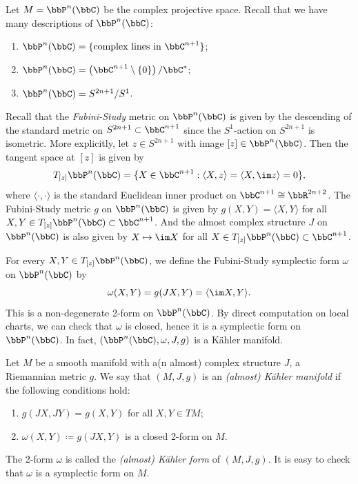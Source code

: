     \begin{example}
        Let \(M = \bbP^n(\bbC)\) be the complex projective space. 
        Recall that we have many descriptions of \(\bbP^n(\bbC)\):
        \begin{enumerate}
            \item \(\bbP^n(\bbC) = \{ \text{complex lines in } \bbC^{n+1} \}\);
            \item \(\bbP^n(\bbC) = \left(\bbC^{n+1} \setminus \{0\}\right) / \bbC^*\);
            \item \(\bbP^n(\bbC) = S^{2n+1} / S^1\).
        \end{enumerate}
        Recall that the \emph{Fubini-Study} metric on \(\bbP^n(\bbC)\) is given by the descending of the standard metric on \(S^{2n+1} \subset \bbC^{n+1}\) since the \(S^1\)-action on \(S^{2n+1}\) is isometric.
        More explicitly, let \(z \in S^{2n+1}\) with image \([z] \in \bbP^n(\bbC)\).
        Then the tangent space at \([z]\) is given by
        \[ T_{[z]}\bbP^n(\bbC) = \{ X \in \bbC^{n+1} : \langle X, z \rangle = \langle X, \im z \rangle = 0 \}, \]
        where \(\langle \cdot, \cdot \rangle\) is the standard Euclidean inner product on \(\bbC^{n+1} \cong \bbR^{2n+2}\).
        The Fubini-Study metric \(g\) on \(\bbP^n(\bbC)\) is given by \(g(X,Y) = \langle X, Y \rangle\) for all \(X,Y \in T_{[z]}\bbP^n(\bbC) \subset \bbC^{n+1}\).
        And the almost complex structure \(J\) on \(\bbP^n(\bbC)\) is also given by \(X \mapsto \im X\) for all \(X \in T_{[z]}\bbP^n(\bbC) \subset \bbC^{n+1}\).

        For every \(X,Y \in T_{[z]}\bbP^n(\bbC)\), we define the Fubini-Study symplectic form \(\omega\) on \(\bbP^n(\bbC)\) by
        \[ \omega(X,Y) = g(JX,Y) = \langle \im X, Y \rangle. \]
        This is a non-degenerate 2-form on \(\bbP^n(\bbC)\).
        By direct computation on local charts, we can check that \(\omega\) is closed, hence it is a symplectic form on \(\bbP^n(\bbC)\).
        In fact, \((\bbP^n(\bbC), \omega, J, g)\) is a Kähler manifold.
    \end{example}

    \begin{definition}
        Let \(M\) be a smooth manifold with a(n almost) complex structure \(J\), a Riemannian metric \(g\).
        We say that \((M, J, g)\) is an \emph{(almost) Kähler manifold} if the following conditions hold:
        \begin{enumerate}
            \item \(g(JX,JY) = g(X,Y)\) for all \(X,Y \in TM\);
            \item \(\omega(X,Y) \coloneqq g(JX,Y)\) is a closed 2-form on \(M\).
        \end{enumerate}
        The 2-form \(\omega\) is called the \emph{(almost) Kähler form} of \((M, J, g)\).
        It is easy to check that \(\omega\) is a symplectic form on \(M\).
    \end{definition}

